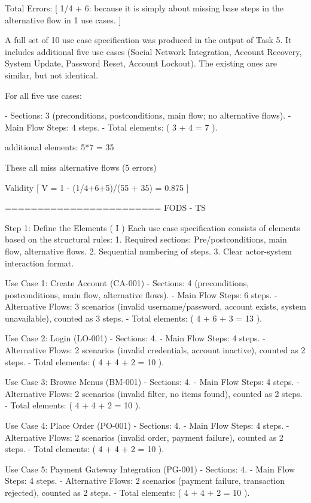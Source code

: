 Total Errors:
[
1/4 + 6: because it is simply about missing base steps in the alternative flow in 1 use cases. 
]

A full set of 10 use case specification was produced in the output of Task 5. It includes additional five use cases (Social Network Integration, Account Recovery, System Update, Password Reset, Account Lockout). The existing ones are similar, but not identical. 

For all five use cases:

- Sections: 3 (preconditions, postconditions, main flow; no alternative flows).
- Main Flow Steps: 4 steps.
- Total elements: ( 3 + 4 = 7 ).

additional elements: 5*7 = 35

These all miss alternative flows (5 errors)

Validity
[
V = 1 - (1/4+6+5)/(55 + 35) = 0.875
]

========================
FODS - TS

Step 1: Define the Elements ( I )
Each use case specification consists of elements based on the structural rules:
1. Required sections: Pre/postconditions, main flow, alternative flows.
2. Sequential numbering of steps.
3. Clear actor-system interaction format.

Use Case 1: Create Account (CA-001)
- Sections: 4 (preconditions, postconditions, main flow, alternative flows).
- Main Flow Steps: 6 steps.
- Alternative Flows: 3 scenarios (invalid username/password, account exists, system unavailable), counted as 3 steps. 
- Total elements: ( 4 + 6 + 3 = 13 ).

Use Case 2: Login (LO-001)
- Sections: 4.
- Main Flow Steps: 4 steps.
- Alternative Flows: 2 scenarios (invalid credentials, account inactive), counted as 2 steps.
- Total elements: ( 4 + 4 + 2 = 10 ).

Use Case 3: Browse Menus (BM-001)
- Sections: 4.
- Main Flow Steps: 4 steps.
- Alternative Flows: 2 scenarios (invalid filter, no items found), counted as 2 steps.
- Total elements: ( 4 + 4 + 2 = 10 ).

Use Case 4: Place Order (PO-001)
- Sections: 4.
- Main Flow Steps: 4 steps.
- Alternative Flows: 2 scenarios (invalid order, payment failure), counted as 2 steps.
- Total elements: ( 4 + 4 + 2 = 10 ).

Use Case 5: Payment Gateway Integration (PG-001)
- Sections: 4.
- Main Flow Steps: 4 steps.
- Alternative Flows: 2 scenarios (payment failure, transaction rejected), counted as 2 steps.
- Total elements: ( 4 + 4 + 2 = 10 ).

